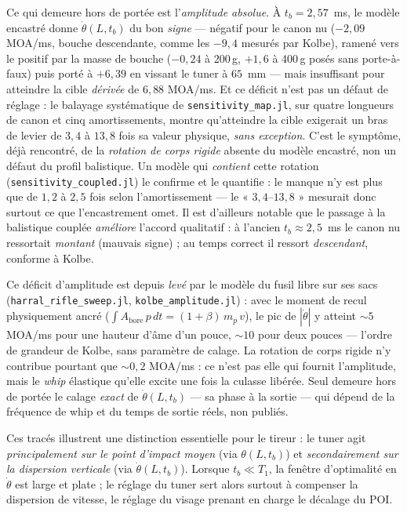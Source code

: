 \documentclass[12pt,a4paper]{article}
\begin{document}
	Ce qui demeure hors de portée est l'\emph{amplitude absolue}. À $t_b = 2{,}57$~ms, le modèle encastré donne $\dot\theta(L,t_b)$ du bon \emph{signe} --- négatif pour le canon nu ($-2{,}09$ MOA/ms, bouche descendante, comme les $-9{,}4$ mesurés par Kolbe), ramené vers le positif par la masse de bouche ($-0{,}24$ à 200\,g, $+1{,}6$ à 400\,g posés sans porte-à-faux) puis porté à $+6{,}39$ en vissant le tuner à $65$~mm --- mais insuffisant pour atteindre la cible \emph{dérivée} de $6{,}88$ MOA/ms. Et ce déficit n'est pas un défaut de réglage : le balayage systématique de \texttt{sensitivity\_map.jl}, sur quatre longueurs de canon et cinq amortissements, montre qu'atteindre la cible exigerait un bras de levier de $3{,}4$ à $13{,}8$ fois sa valeur physique, \emph{sans exception}. C'est le symptôme, déjà rencontré, de la \emph{rotation de corps rigide} absente du modèle encastré, non un défaut du profil balistique. Un modèle qui \emph{contient} cette rotation (\texttt{sensitivity\_coupled.jl}) le confirme et le quantifie : le manque n'y est plus que de $1{,}2$ à $2{,}5$ fois selon l'amortissement --- le « $3{,}4$--$13{,}8$ » mesurait donc surtout ce que l'encastrement omet. Il est d'ailleurs notable que le passage à la balistique couplée \emph{améliore} l'accord qualitatif : à l'ancien $t_b \approx 2{,}5$~ms le canon nu ressortait \emph{montant} (mauvais signe) ; au temps correct il ressort \emph{descendant}, conforme à Kolbe.

	Ce déficit d'amplitude est depuis \emph{levé} par le modèle du fusil libre sur ses sacs (\texttt{harral\_rifle\_sweep.jl}, \texttt{kolbe\_amplitude.jl}) : avec le moment de recul physiquement ancré ($\int A_\text{bore}\,p\,dt = (1+\beta)\,m_p\,v$), le pic de $|\dot\theta|$ y atteint $\sim 5$ MOA/ms pour une hauteur d'âme d'un pouce, $\sim 10$ pour deux pouces --- l'ordre de grandeur de Kolbe, sans paramètre de calage. La rotation de corps rigide n'y contribue pourtant que $\sim 0{,}2$ MOA/ms : ce n'est pas elle qui fournit l'amplitude, mais le \emph{whip} élastique qu'elle excite une fois la culasse libérée. Seul demeure hors de portée le calage \emph{exact} de $\dot\theta(L,t_b)$ --- sa phase à la sortie --- qui dépend de la fréquence de whip et du temps de sortie réels, non publiés.

	Ces tracés illustrent une distinction essentielle pour le tireur : le tuner agit \emph{principalement sur le point d'impact moyen} (via $\theta(L,t_b)$) et \emph{secondairement sur la dispersion verticale} (via $\dot\theta(L,t_b)$). Lorsque $t_b \ll T_1$, la fenêtre d'optimalité en $\dot\theta$ est large et plate ; le réglage du tuner sert alors surtout à compenser la dispersion de vitesse, le réglage du visage prenant en charge le décalage du POI.
\end{document}
